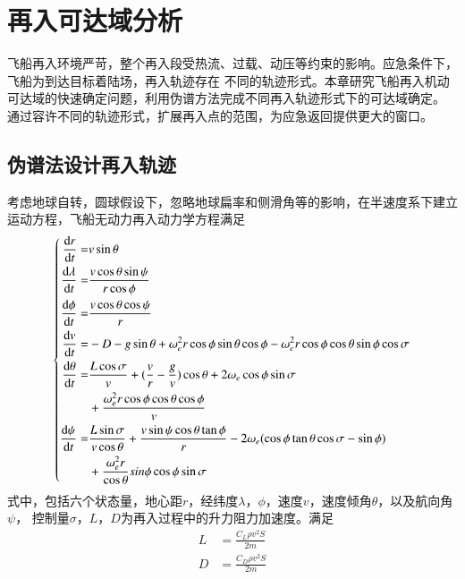 \chapter{再入可达域分析}

飞船再入环境严苛，整个再入段受热流、过载、动压等约束的影响。应急条件下，飞船为到达目标着陆场，再入轨迹存在
不同的轨迹形式。本章研究飞船再入机动可达域的快速确定问题，利用伪谱方法完成不同再入轨迹形式下的可达域确定。
通过容许不同的轨迹形式，扩展再入点的范围，为应急返回提供更大的窗口。

\section{伪谱法设计再入轨迹}

考虑地球自转，圆球假设下，忽略地球扁率和侧滑角等的影响，在半速度系下建立运动方程，飞船无动力再入动力学方程满足
\begin{equation}
	\left\{
	\begin{aligned}
		\frac{\dif r}{\dif t}=       & v \sin \theta                                                           \\
		\frac{\dif \lambda}{\dif t}= & \frac{v \cos \theta \sin \psi}
		{r \cos \phi}                                                                                          \\
		\frac{\dif \phi}{\dif t}=    & \frac{v \cos \theta \cos \psi}{r}                                       \\
		\frac{\dif v}{\dif t}=       & -D-g \sin \theta +\omega_e^2r\cos\phi \sin\theta \cos\phi-
		\omega_e^2r\cos\phi\cos\theta\sin\phi\cos\sigma                                                        \\
		\frac{\dif\theta}{\dif t} =  & \frac{L\cos\sigma}{v}+(\frac{v}{r}-
		\frac{g}{v})\cos\theta+2\omega_e\cos\phi\sin\sigma                                                     \\
		                             & {}+\frac{\omega_e^2r\cos\phi\cos\theta\cos\phi}{v}                      \\
		\frac{\dif\psi}{\dif t} =    & \frac{L\sin\sigma}{v\cos\theta}+\frac{v\sin \psi\cos \theta\tan\phi}{r}
		-2\omega_e(\cos\phi\tan\theta\cos\sigma-\sin\phi)                                                      \\
		                             & {}+\frac{\omega_e^2r}{\cos\theta}sin\phi\cos\phi\sin\sigma
	\end{aligned}
	\right.
\end{equation}
式中，包括六个状态量，地心距$r$，经纬度$\lambda$，$\phi$，速度$v$，速度倾角$\theta$，以及航向角$\psi$，
控制量$\sigma$，$L$，$D$为再入过程中的升力阻力加速度。满足
\begin{align}
	L & =\frac{C_L\rho v^2S}{2m} \\
	D & =\frac{C_D\rho v^2S}{2m}
\end{align}